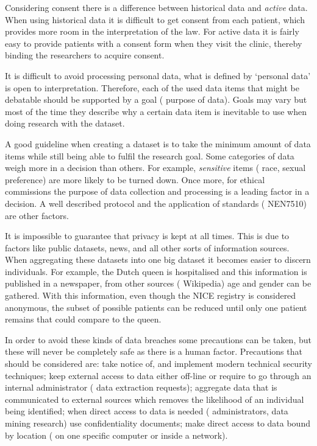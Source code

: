 Considering consent there is a difference between historical data and \emph{active} data.
When using historical data it is difficult to get consent from each patient, which provides more room in the interpretation of the law.
For active data it is fairly easy to provide patients with a consent form when they visit the clinic, thereby binding the researchers to acquire consent.

It is difficult to avoid processing personal data, \ie{} what is defined by `personal data' is open to interpretation.
Therefore, each of the used data items that might be debatable should be supported by a goal (\ie{} purpose of data).
Goals may vary but most of the time they describe why a certain data item is inevitable to use when doing research with the dataset.

A good guideline when creating a dataset is to take the minimum amount of data items while still being able to fulfil the research goal.
Some categories of data weigh more in a decision than others.
For example, \emph{sensitive} items (\eg{} race, sexual preference) are more likely to be turned down.
Once more, for ethical commissions the purpose of data collection and processing is a leading factor in a decision. 
A well described protocol and the application of standards (\eg{} NEN7510) are other factors.

It is impossible to guarantee that privacy is kept at all times.
This is due to factors like public datasets, news, and all other sorts of information sources.
When aggregating these datasets into one big dataset it becomes easier to discern individuals. 
For example, the Dutch queen is hospitalised and this information is published in a newspaper, from other sources (\eg{} Wikipedia) age and gender can be gathered.
With this information, even though the NICE registry is considered anonymous, the subset of possible patients can be reduced until only one patient remains that could compare to the queen.

In order to avoid these kinds of data breaches some precautions can be taken, but these will never be completely safe as there is a human factor.
Precautions that should be considered are: take notice of, and implement modern technical security techniques; keep external access to data either off-line or require to go through an internal administrator (\eg{} data extraction requests); aggregate data that is communicated to external sources which removes the likelihood of an individual being identified; when direct access to data is needed (\eg{} administrators, data mining research) use confidentiality documents; make direct access to data bound by location (\eg{} on one specific computer or inside a network).

